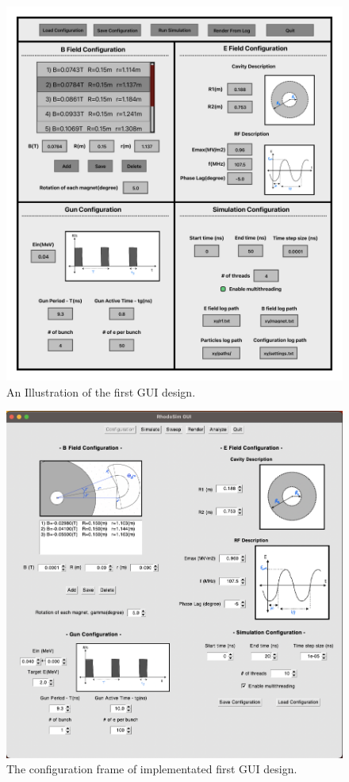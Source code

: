 \documentclass[a4paper,oneside,12pt]{report}
\numberwithin{equation}{chapter}
\begin{document}
\begin{figure}[H]
    \centering
    \includegraphics[width=\linewidth]{./figures/illustrations/RhodoSim_GUI_Draft_V02.pdf}
    \caption{An Illustration of the first GUI design.}
    \label{fig:gui_illustration}
\end{figure}

\begin{figure}
    \centering
    \includegraphics[width=\linewidth]{./figures/rhodoSim/GUI_config_frame.png}
    \caption{The configuration frame of implementated first GUI design.}
    \label{fig:gui_config}
\end{figure}
\end{document}
